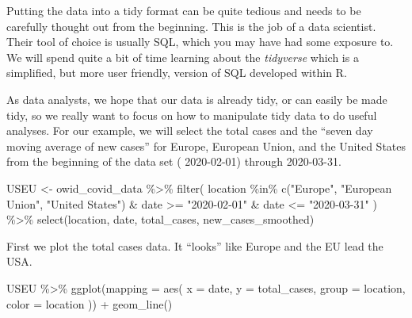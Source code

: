\documentclass[
]{article}
\newenvironment{Shaded}{}{}
\newcommand{\AttributeTok}[1]{#1}
\newcommand{\FunctionTok}[1]{#1}
\newcommand{\NormalTok}[1]{#1}
\newcommand{\OtherTok}[1]{\textcolor[rgb]{1.00,0.25,0.00}{#1}}
\newcommand{\SpecialCharTok}[1]{\textcolor[rgb]{0.00,0.50,0.50}{#1}}
\newcommand{\StringTok}[1]{\textcolor[rgb]{0.00,0.50,0.50}{#1}}
\begin{document}
Putting the data into a tidy format can be quite tedious and needs to be
carefully thought out from the beginning. This is the job of a data
scientist. Their tool of choice is usually SQL, which you may have had
some exposure to. We will spend quite a bit of time learning about the
\emph{tidyverse} which is a simplified, but more user friendly, version
of SQL developed within R.

As data analysts, we hope that our data is already tidy, or can easily
be made tidy, so we really want to focus on how to manipulate tidy data
to do useful analyses. For our example, we will select the total cases
and the ``seven day moving average of new cases'' for Europe, European
Union, and the United States from the beginning of the data set (
2020-02-01) through 2020-03-31.

\begin{Shaded}
\begin{Highlighting}[]
\NormalTok{USEU }\OtherTok{\textless{}{-}}\NormalTok{ owid\_covid\_data }\SpecialCharTok{\%\textgreater{}\%}
  \FunctionTok{filter}\NormalTok{(}
\NormalTok{    location }\SpecialCharTok{\%in\%} \FunctionTok{c}\NormalTok{(}\StringTok{"Europe"}\NormalTok{, }\StringTok{"European Union"}\NormalTok{, }\StringTok{"United States"}\NormalTok{) }\SpecialCharTok{\&}
\NormalTok{      date }\SpecialCharTok{\textgreater{}=} \StringTok{"2020{-}02{-}01"} \SpecialCharTok{\&}\NormalTok{ date }\SpecialCharTok{\textless{}=} \StringTok{"2020{-}03{-}31"}
\NormalTok{  ) }\SpecialCharTok{\%\textgreater{}\%}
  \FunctionTok{select}\NormalTok{(location, date, total\_cases, new\_cases\_smoothed)}
\end{Highlighting}
\end{Shaded}

First we plot the total cases data. It ``looks'' like Europe and the EU
lead the USA.

\begin{Shaded}
\begin{Highlighting}[]
\NormalTok{USEU }\SpecialCharTok{\%\textgreater{}\%}
  \FunctionTok{ggplot}\NormalTok{(}\AttributeTok{mapping =} \FunctionTok{aes}\NormalTok{(}
    \AttributeTok{x =}\NormalTok{ date,}
    \AttributeTok{y =}\NormalTok{ total\_cases,}
    \AttributeTok{group =}\NormalTok{ location,}
    \AttributeTok{color =}\NormalTok{ location}
\NormalTok{  )) }\SpecialCharTok{+} \FunctionTok{geom\_line}\NormalTok{() }
\end{Highlighting}
\end{Shaded}
\end{document}
